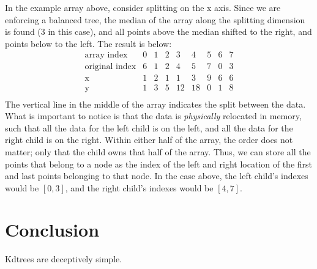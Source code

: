 \documentclass[journal]{IEEEtran}
\begin{document}
In the example array above, consider splitting on the x axis. Since we are
enforcing a balanced tree, the median of the array along the splitting
dimension is found (3 in this case), and all points above the median shifted to
the right, and points below to the left. The result is below:
\begin{equation*}
    \begin{array}{r||cccc|cccc}
    \textrm{array~index}     & 0 & 1 & 2 & 3  & 4  & 5 & 6 & 7 \\
    \textrm{original~index}  & 6 & 1 & 2 & 4  & 5  & 7 & 0 & 3 \\
    \textrm{x}               & 1 & 2 & 1 & 1  & 3  & 9 & 6 & 6 \\
    \textrm{y}               & 1 & 3 & 5 & 12 & 18 & 0 & 1 & 8 \\
    \end{array}
\end{equation*}
The vertical line in the middle of the array indicates the split between the
data. What is important to notice is that the data is {\em physically}
relocated in memory, such that all the data for the left child is on the left,
and all the data for the right child is on the right. Within either half of the
array, the order does not matter; only that the child owns that half of the
array. Thus, we can store all the points that belong to a node as the index of
the left and right location of the first and last points belonging to that node.
In the case above, the left child's indexes would be $[0,3]$, and the right
child's indexes would be $[4,7]$. 

\section{Conclusion}
Kdtrees are deceptively simple.

\end{document}
